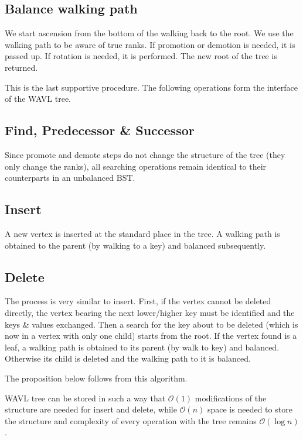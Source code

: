 \subsection{Balance walking path}

We start ascension from the bottom of the walking back to the root. We use the walking path to be aware of true ranks. If promotion or demotion is needed, it is passed up. If rotation is needed, it is performed. The new root of the tree is returned. 

This is the last supportive procedure. The following operations form the interface of the WAVL tree.

\subsection{Find, Predecessor \& Successor}

Since promote and demote steps do not change the structure of the tree (they only change the ranks), all searching operations remain identical to their counterparts in an unbalanced BST.

\subsection{Insert}

A new vertex is inserted at the standard place in the tree. A walking path is obtained to the parent (by walking to a key) and balanced subsequently.

\subsection{Delete}

The process is very similar to insert. First, if the vertex cannot be deleted directly, the vertex bearing the next lower/higher key must be identified and the keys \& values exchanged. Then a search for the key about to be deleted (which is now in a vertex with only one child) starts from the root. If the vertex found is a leaf, a walking path is obtained to its parent (by walk to key) and balanced. Otherwise its child is deleted and the walking path to it is balanced.

The proposition below follows from this algorithm.

\begin{prop}
WAVL tree can be stored in such a way that $\mathcal{O}(1)$ modifications of the structure are needed for insert and delete, while $\mathcal{O}(n)$ space is needed to store the structure and complexity of every operation with the tree remains $\mathcal{O}(\log n)$.
\end{prop}

